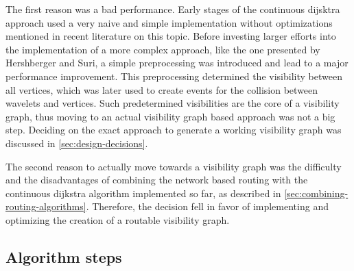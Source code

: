 		The first reason was a bad performance.
		Early stages of the continuous dijsktra approach used a very naive and simple implementation without optimizations mentioned in recent literature on this topic.
		Before investing larger efforts into the implementation of a more complex approach, like the one presented by Hershberger and Suri\cite{hershberger-suri}, a simple preprocessing was introduced and lead to a major performance improvement.
		This preprocessing determined the visibility between all vertices, which was later used to create events for the collision between wavelets and vertices.
		Such predetermined visibilities are the core of a visibility graph, thus moving to an actual visibility graph based approach was not a big step.
		Deciding on the exact approach to generate a working visibility graph was discussed in \cref{sec:design-decisions}.
		
		The second reason to actually move towards a visibility graph was the difficulty and the disadvantages of combining the network based routing with the continuous dijkstra algorithm implemented so far, as described in \cref{sec:combining-routing-algorithms}.
		Therefore, the decision fell in favor of implementing and optimizing the creation of a routable visibility graph.
	
%
			
	\subsection{Algorithm steps}
	\label{subsec:algorithm-steps}
		
